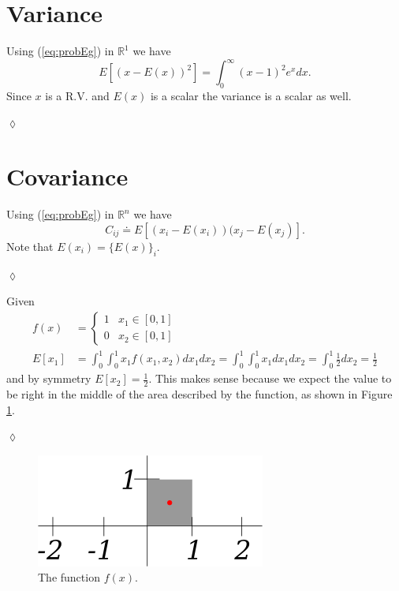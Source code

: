 \section{Variance}
\begin{example}
Using (\ref{eq:probEg}) in $\mathbb{R}^1$ we have
$$E[(x - E(x))^2] = \int_0^\infty (x-1)^2e^xdx.$$
Since $x$ is a R.V. and $E(x)$ is a scalar the variance is a scalar as well.
\end{example}
$\lozenge$

\section{Covariance}
\begin{example}
Using (\ref{eq:probEg}) in $\mathbb{R}^n$ we have $$C_{ij} \doteq E[(x_i - E(x_i))(x_j - E(x_j)].$$ Note that $E(x_i) = \lbrace E(x) \rbrace_i$.
\end{example}
$\lozenge$

\begin{example}
Given
\begin{align*}
f(x) &= \begin{cases} 1 & x_1 \in [0,1] \\ 0 & x_2 \in [0,1] \end{cases} \\
E[x_1] &= \int_0^1 \int_0^1 x_1f(x_1,x_2)dx_1dx_2 = \int_0^1 \int_0^1 x_1dx_1dx_2 = \int_0^1 \frac{1}{2}dx_2 = \frac{1}{2}
\end{align*}
and by symmetry $E[x_2] = \frac{1}{2}$. This makes sense because we expect the value to be right in the middle of the area described by the function, as shown in Figure \ref{fig:01box}.
\end{example}
$\lozenge$
\begin{figure}[ht!]
	\centering
	\includegraphics[width=.45\textwidth]{images/01box}
	\caption{The function $f(x)$.}
	\label{fig:01box}
\end{figure}

